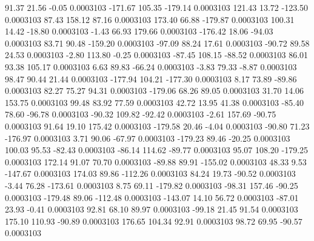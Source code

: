        91.37       21.56       -0.05     0.0003103
     -171.67      105.35     -179.14     0.0003103
      121.43       13.72     -123.50     0.0003103
       87.43      158.12       87.16     0.0003103
      173.40       66.88     -179.87     0.0003103
      100.31       14.42      -18.80     0.0003103
       -1.43       66.93      179.66     0.0003103
     -176.42       18.06      -94.03     0.0003103
       83.71       90.48     -159.20     0.0003103
      -97.09       88.24       17.61     0.0003103
      -90.72       89.58       24.53     0.0003103
       -2.80      113.80       -0.25     0.0003103
      -87.45      108.15      -88.52     0.0003103
       86.01       93.38      105.17     0.0003103
        6.63       89.83      -66.24     0.0003103
       -3.83       79.33       -8.87     0.0003103
       98.47       90.44       21.44     0.0003103
     -177.94      104.21     -177.30     0.0003103
        8.17       73.89      -89.86     0.0003103
       82.27       75.27       94.31     0.0003103
     -179.06       68.26       89.05     0.0003103
       31.70       14.06      153.75     0.0003103
       99.48       83.92       77.59     0.0003103
       42.72       13.95       41.38     0.0003103
      -85.40       78.60      -96.78     0.0003103
      -90.32      109.82      -92.42     0.0003103
       -2.61      157.69      -90.75     0.0003103
       91.64       19.10      175.42     0.0003103
     -179.58       20.46       -4.04     0.0003103
      -90.80       71.23     -176.97     0.0003103
        3.71       90.06      -67.97     0.0003103
     -179.23       89.46      -20.25     0.0003103
      100.03       95.53      -82.43     0.0003103
      -86.14      114.62      -89.77     0.0003103
       95.07      108.20     -179.25     0.0003103
      172.14       91.07       70.70     0.0003103
      -89.88       89.91     -155.02     0.0003103
       48.33        9.53     -147.67     0.0003103
      174.03       89.86     -112.26     0.0003103
       84.24       19.73      -90.52     0.0003103
       -3.44       76.28     -173.61     0.0003103
        8.75       69.11     -179.82     0.0003103
      -98.31      157.46      -90.25     0.0003103
     -179.48       89.06     -112.48     0.0003103
     -143.07       14.10       56.72     0.0003103
      -87.01       23.93       -0.41     0.0003103
       92.81       68.10       89.97     0.0003103
      -99.18       21.45       91.54     0.0003103
      175.10      110.93      -90.89     0.0003103
      176.65      104.34       92.91     0.0003103
       98.72       69.95      -90.57     0.0003103
